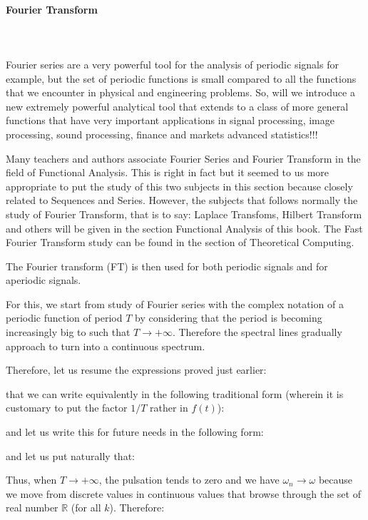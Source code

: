 	
	\pagebreak
	\paragraph{Fourier Transform}\label{fourier transform}\mbox{}\\\\
	Fourier series are a very powerful tool for the analysis of periodic signals for example, but the set of periodic functions is small compared to all the functions that we encounter in physical and engineering problems. So, will we introduce a new extremely powerful analytical tool that extends to a class of more general functions that have very important applications in signal processing, image processing, sound processing, finance and markets advanced statistics!!!
	
	\begin{tcolorbox}[title=Remark,colframe=black,arc=10pt]
	Many teachers and authors associate Fourier Series and Fourier Transform in the field of Functional Analysis. This is right in fact but it seemed to us more appropriate to put the study of this two subjects in this section because closely related to Sequences and Series. However, the subjects that follows normally the study of Fourier Transform, that is to say: Laplace Transfoms, Hilbert Transform and others will be given in the section Functional Analysis of this book. The Fast Fourier Transform study can be found in the section of Theoretical Computing.
	\end{tcolorbox}
	The Fourier transform (FT) is then used for both periodic signals and for aperiodic signals.
	
	For this, we start from study of Fourier series with the complex notation of a periodic function of period $T$ by considering that the period is becoming increasingly big to such that $T\rightarrow +\infty$. Therefore the spectral lines gradually approach to turn into a continuous spectrum.
	
	Therefore, let us resume the expressions proved just earlier:
	
	that we can write equivalently in the following traditional form (wherein it is customary to put the factor $1/T$ rather in $f(t)$):
	
	and let us write this for future needs in the following form:
	
	and let us put naturally that:
	
	Thus, when $T\rightarrow +\infty$, the pulsation tends to zero and we have $\omega_n\rightarrow \omega$ because we move from discrete values in continuous values that browse through the set of real number $\mathbb{R}$ (for all $k$). Therefore:
	
